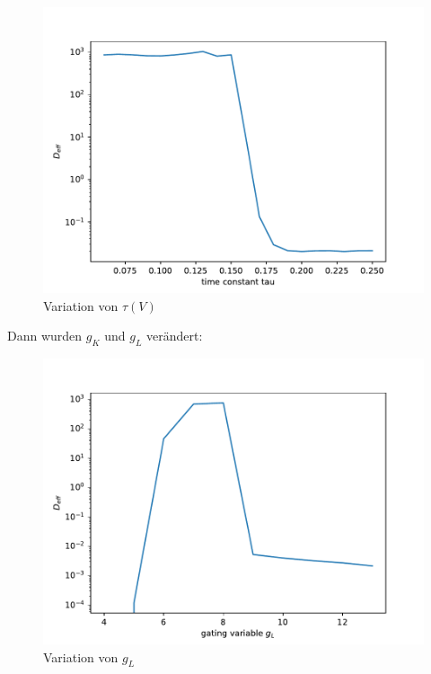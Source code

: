 \documentclass[12pt,a4paper]{article}
\begin{document}
\begin{figure}[H]
	\centering
	\includegraphics[scale=0.9]{dneurtvar.pdf} 
	\caption{Variation von $\tau(V)$}
	\label{tvar}
\end{figure} 
Dann wurden $g_K$ und $g_L$ verändert:
\begin{figure}[H]
	\centering
	\includegraphics[scale=0.9]{dneurglvar.pdf} 
	\caption{Variation von $g_L$}
	\label{glvar}
\end{figure} 
\end{document}
